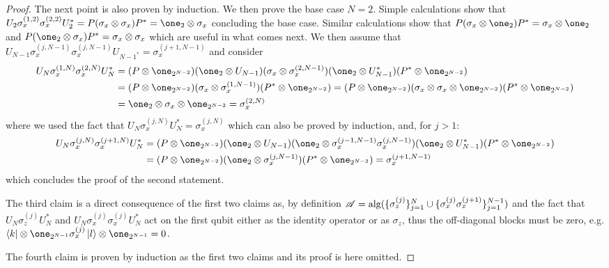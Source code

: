 \documentclass[aihp,12pt]{imsart}
\begin{document}
\begin{proof}
    The next point is also proven by induction. 
    We then prove the base case $N=2$. Simple calculations show that \(U_2\sigma_x^{(1,2)}\sigma_x^{(2,2)} U_2^* = P (\sigma_x\otimes\sigma_x) P^* = \one_2\otimes\sigma_x\) concluding the base case. Similar calculations show that \(P(\sigma_x\otimes\one_2)P^* = \sigma_x\otimes \one_2 \) and \(P(\one_2\otimes\sigma_x)P^* = \sigma_x\otimes \sigma_x \) which are useful in what comes next. We then assume that $U_{N-1} \sigma_x^{(j,N-1)}\sigma_x^{(j,N-1)} U_{N-1^*} = \sigma_x^{(j+1,N-1)}$ and consider
    \begin{align*}
        U_N \sigma_x^{(1,N)}\sigma_x^{(2,N)}U_N^* &= (P\otimes\one_{2^{N-2}})(\one_2\otimes U_{N-1}) (\sigma_x\otimes \sigma_x^{(2,N-1)}) (\one_2\otimes U_{N-1}^*) (P^*\otimes\one_{2^{N-2}})\\
        &= (P\otimes\one_{2^{N-2}}) (\sigma_x\otimes \sigma_x^{(1,N-1)}) (P^*\otimes\one_{2^{N-2}}) = (P\otimes\one_{2^{N-2}}) (\sigma_x\otimes \sigma_x \otimes \one_{2^{N-2}} ) (P^*\otimes\one_{2^{N-2}}) \\&= \one_2\otimes\sigma_x\otimes \one_{2^{N-2}} = \sigma_x^{(2,N)}
    \end{align*}
    where we used the fact that $U_N\sigma_x^{(j,N)}U_N^* = \sigma_x^{(j,N)}$ which can also be proved by induction, and, for $j>1$:
    \begin{align*}
        U_N \sigma_x^{(j,N)}\sigma_x^{(j+1,N)}U_N^* &= (P\otimes\one_{2^{N-2}})(\one_2\otimes U_{N-1}) (\one_2\otimes \sigma_x^{(j-1,N-1)}\sigma_x^{(j,N-1)}) (\one_2\otimes U_{N-1}^*) (P^*\otimes\one_{2^{N-2}})\\
        &= (P\otimes\one_{2^{N-2}})(\one_2\otimes \sigma_x^{(j,N-1)}) (P^*\otimes\one_{2^{N-2}}) = \sigma_x^{(j+1,N-1)}
    \end{align*}
    which concludes the proof of the second statement. 

    The third claim is a direct consequence of the first two claims as, by definition $\mathscr{A} = {\rm alg}(\{\sigma_z^{(j)}\}_{j=1}^N\cup\{\sigma_x^{(j)}\sigma_x^{(j+1)}\}_{j=1}^{N-1})$ and the fact that $U_N \sigma_z^{(j)} U_N^*$ and $U_N \sigma_x^{(j)}\sigma_x^{(j)} U_N^*$ act on the first qubit either as the identity operator or as $\sigma_z$, thus the off-diagonal blocks must be zero, e.g. $\bra{k}\otimes\one_{2^{N-1}} \sigma_x^{(j)} \ket{l}\otimes\one_{2^{N-1}} = 0$.

    The fourth claim is proven by induction as the first two claims and its proof is here omitted.
\end{proof}
\end{document}
